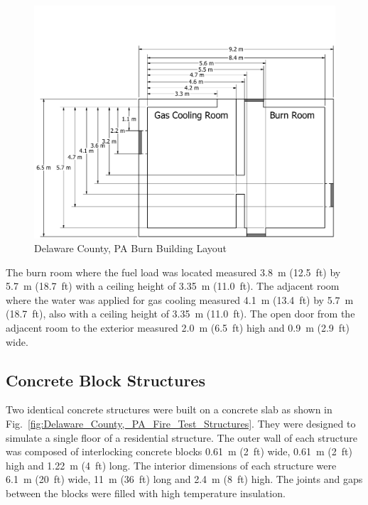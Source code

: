 \documentclass[12pt,oneside]{book}
\begin{document}
\begin{figure}[!ht]
	\includegraphics[width=\columnwidth]{../Figures/Floor_Plans/PDFs/West_Structure/DelCo_2012_West_Structure_Plain}
	\caption{Delaware County, PA Burn Building Layout}
	\label{fig:Delaware_County,_PA_Burn_Building_Layout}
\end{figure}

The burn room where the fuel load was located measured 3.8~m (12.5~ft) by 5.7~m (18.7~ft) with a ceiling height of 3.35~m (11.0~ft). The adjacent room where the water was applied for gas cooling measured 4.1~m (13.4~ft) by 5.7~m (18.7~ft), also with a ceiling height of 3.35~m (11.0~ft). The open door from the adjacent room to the exterior measured 2.0~m (6.5~ft) high and 0.9~m (2.9~ft) wide.

\subsection{Concrete Block Structures}
\label{sec:Experimental Structures}

Two identical concrete structures were built on a concrete slab as shown in Fig.~\ref{fig:Delaware_County,_PA_Fire_Test_Structures}. They were designed to simulate a single floor of a residential structure.  The outer wall of each structure was composed of interlocking concrete blocks 0.61~m (2~ft) wide, 0.61~m (2~ft) high and 1.22~m (4~ft) long.  The interior dimensions of each structure were 6.1~m (20~ft) wide, 11~m (36~ft) long and 2.4~m (8~ft) high. The joints and gaps between the blocks were filled with high temperature insulation.
\end{document}
